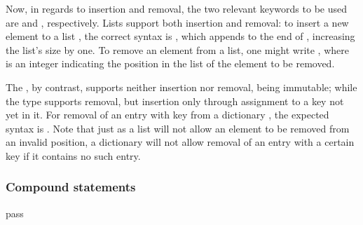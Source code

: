 Now, in regards to insertion and removal, the two relevant keywords to be used are  and , respectively. Lists support both insertion and removal: to insert a new element  to a list , the correct syntax is    , which appends  to the end of , increasing the list's size by one. To remove an element from a list, one might write    , where  is an integer indicating the position in the list of the element to be removed.

The , by contrast, supports neither insertion nor removal, being immutable; while the  type supports removal, but insertion only through assignment to a key not yet in it. For removal of an entry with key  from a dictionary , the expected syntax is    . Note that just as a list will not allow an element to be removed from an invalid position, a dictionary will not allow removal of an entry with a certain key if it contains no such entry.

\subsubsection{Compound statements}
\label{sec:compound-stmts}
pass